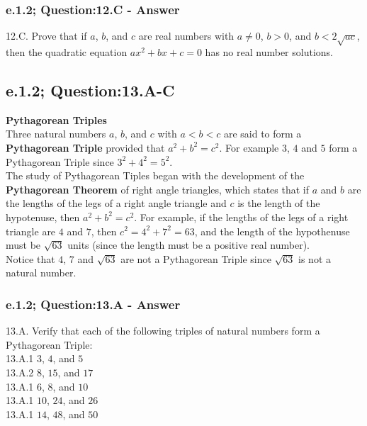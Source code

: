 \newpage
\subsubsection*{e.1.2; Question:12.C - Answer}
12.C. Prove that if $a$, $b$, and $c$ are real numbers with $a \neq 0$, $b>0$, and $b<2 \sqrt{ac}$, then the quadratic equation $ax^2 + bx + c = 0$ has no real number solutions. \\



\subsection{e.1.2; Question:13.A-C}

{\bf Pythagorean Triples} \\
Three natural numbers $a$, $b$, and $c$ with $a < b < c $ are said to form a {\bf Pythagorean Triple} provided that $a^2 + b^2 = c^2$. For example $3$, $4$ and $5$ form a Pythagorean Triple since $3^2 + 4^2 = 5^2$. \\

The study of Pythagorean Tiples began with the development of the {\bf Pythagorean Theorem} of right angle triangles, which states that if $a$ and $b$ are the lengths of the legs of a right angle triangle and $c$ is the length of the hypotenuse, then $a^2 + b^2 = c^2$. For example, if the lengths of the legs of a right triangle are $4$ and $7$, then $c^2 = 4^2 + 7^2 = 63$, and the length of the hypothenuse must be $\sqrt{63}$ units (since the length must be a positive real number). \\

Notice that $4$, $7$ and $\sqrt{63}$ are not a Pythagorean Triple since $\sqrt{63}$ is not a natural number. \\

\subsubsection*{e.1.2; Question:13.A - Answer}
13.A. Verify that each of the following triples of natural numbers form a Pythagorean Triple: \\
13.A.1 $3$, $4$, and $5$ \\
13.A.2 $8$, $15$, and $17$ \\
13.A.1 $6$, $8$, and $10$ \\
13.A.1 $10$, $24$, and $26$ \\
13.A.1 $14$, $48$, and $50$ \\

